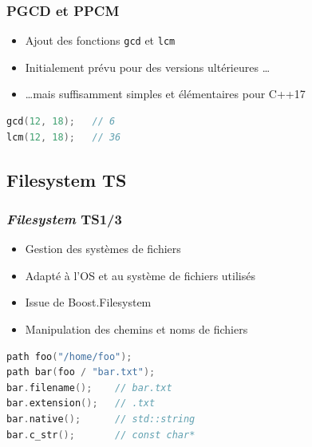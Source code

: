 \documentclass[C++.tex]{subfiles}
\begin{document}
\begin{frame}[fragile]
	\frametitle{PGCD et PPCM}
	\begin{itemize}
		\item Ajout des fonctions \lstinline|gcd| et \lstinline|lcm|
		\item Initialement prévu pour des versions ultérieures \ldots
		\item \ldots mais suffisamment simples et élémentaires pour C++17 
	\end{itemize}

	\begin{lstlisting}[language=C++]
gcd(12, 18);   // 6
lcm(12, 18);   // 36\end{lstlisting}
\end{frame}

\subsection*{Filesystem TS}
\begin{frame}[fragile]
	\frametitle{\textit{Filesystem} TS\titlehfill{}1/3}
	\begin{itemize}
		\item Gestion des systèmes de fichiers
		\item Adapté à l'OS et au système de fichiers utilisés
		\item Issue de Boost.Filesystem
		\item Manipulation des chemins et noms de fichiers
	\end{itemize}

	\begin{lstlisting}[language=C++]
path foo("/home/foo");
path bar(foo / "bar.txt");
bar.filename();    // bar.txt
bar.extension();   // .txt
bar.native();      // std::string
bar.c_str();       // const char*\end{lstlisting}
\end{frame}
\end{document}
